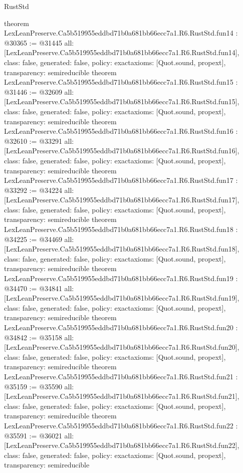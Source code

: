 \begin{lexlean}{RustStd}
\begin{coremodule}
{}
theorem LexLeanPreserve.Ca5b519955eddbd71b0a681bb66ecc7a1.R6.RustStd.fun14 : @30365 := @31445 {
  all: [LexLeanPreserve.Ca5b519955eddbd71b0a681bb66ecc7a1.R6.RustStd.fun14],
  class: false,
  generated: false,
  policy: exact{axioms: [Quot.sound, propext]},
  transparency: semireducible
}
theorem LexLeanPreserve.Ca5b519955eddbd71b0a681bb66ecc7a1.R6.RustStd.fun15 : @31446 := @32609 {
  all: [LexLeanPreserve.Ca5b519955eddbd71b0a681bb66ecc7a1.R6.RustStd.fun15],
  class: false,
  generated: false,
  policy: exact{axioms: [Quot.sound, propext]},
  transparency: semireducible
}
theorem LexLeanPreserve.Ca5b519955eddbd71b0a681bb66ecc7a1.R6.RustStd.fun16 : @32610 := @33291 {
  all: [LexLeanPreserve.Ca5b519955eddbd71b0a681bb66ecc7a1.R6.RustStd.fun16],
  class: false,
  generated: false,
  policy: exact{axioms: [Quot.sound, propext]},
  transparency: semireducible
}
theorem LexLeanPreserve.Ca5b519955eddbd71b0a681bb66ecc7a1.R6.RustStd.fun17 : @33292 := @34224 {
  all: [LexLeanPreserve.Ca5b519955eddbd71b0a681bb66ecc7a1.R6.RustStd.fun17],
  class: false,
  generated: false,
  policy: exact{axioms: [Quot.sound, propext]},
  transparency: semireducible
}
theorem LexLeanPreserve.Ca5b519955eddbd71b0a681bb66ecc7a1.R6.RustStd.fun18 : @34225 := @34469 {
  all: [LexLeanPreserve.Ca5b519955eddbd71b0a681bb66ecc7a1.R6.RustStd.fun18],
  class: false,
  generated: false,
  policy: exact{axioms: [Quot.sound, propext]},
  transparency: semireducible
}
theorem LexLeanPreserve.Ca5b519955eddbd71b0a681bb66ecc7a1.R6.RustStd.fun19 : @34470 := @34841 {
  all: [LexLeanPreserve.Ca5b519955eddbd71b0a681bb66ecc7a1.R6.RustStd.fun19],
  class: false,
  generated: false,
  policy: exact{axioms: [Quot.sound, propext]},
  transparency: semireducible
}
theorem LexLeanPreserve.Ca5b519955eddbd71b0a681bb66ecc7a1.R6.RustStd.fun20 : @34842 := @35158 {
  all: [LexLeanPreserve.Ca5b519955eddbd71b0a681bb66ecc7a1.R6.RustStd.fun20],
  class: false,
  generated: false,
  policy: exact{axioms: [Quot.sound, propext]},
  transparency: semireducible
}
theorem LexLeanPreserve.Ca5b519955eddbd71b0a681bb66ecc7a1.R6.RustStd.fun21 : @35159 := @35590 {
  all: [LexLeanPreserve.Ca5b519955eddbd71b0a681bb66ecc7a1.R6.RustStd.fun21],
  class: false,
  generated: false,
  policy: exact{axioms: [Quot.sound, propext]},
  transparency: semireducible
}
theorem LexLeanPreserve.Ca5b519955eddbd71b0a681bb66ecc7a1.R6.RustStd.fun22 : @35591 := @36021 {
  all: [LexLeanPreserve.Ca5b519955eddbd71b0a681bb66ecc7a1.R6.RustStd.fun22],
  class: false,
  generated: false,
  policy: exact{axioms: [Quot.sound, propext]},
  transparency: semireducible
}
\end{coremodule}
\end{lexlean}
